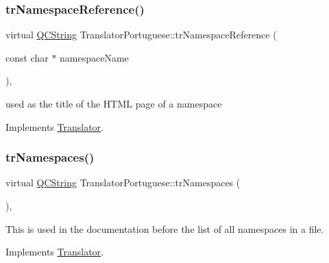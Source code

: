 \mbox{\label{class_translator_portuguese_ab46e3a8d64cb394d06492746feae4114}} 
\subsubsection{\texorpdfstring{trNamespaceReference()}{trNamespaceReference()}}
{\footnotesize\ttfamily virtual \mbox{\hyperlink{class_q_c_string}{Q\+C\+String}} Translator\+Portuguese\+::tr\+Namespace\+Reference (\begin{DoxyParamCaption}\item[{const char $\ast$}]{namespace\+Name }\end{DoxyParamCaption})\hspace{0.3cm}{\ttfamily [inline]}, {\ttfamily [virtual]}}

used as the title of the H\+T\+ML page of a namespace 

Implements \mbox{\hyperlink{class_translator}{Translator}}.

\mbox{\label{class_translator_portuguese_ae023699a28ee15d6f616775c819a2e3a}} 
\subsubsection{\texorpdfstring{trNamespaces()}{trNamespaces()}}
{\footnotesize\ttfamily virtual \mbox{\hyperlink{class_q_c_string}{Q\+C\+String}} Translator\+Portuguese\+::tr\+Namespaces (\begin{DoxyParamCaption}{ }\end{DoxyParamCaption})\hspace{0.3cm}{\ttfamily [inline]}, {\ttfamily [virtual]}}

This is used in the documentation before the list of all namespaces in a file. 

Implements \mbox{\hyperlink{class_translator}{Translator}}.

\mbox{\label{class_translator_portuguese_a44239ac2f452efa7ceacd54f5e4beddb}} 
